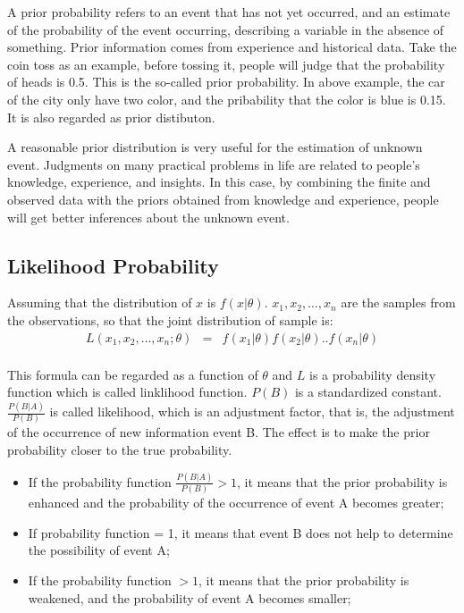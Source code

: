 A prior probability refers to an event that has not yet occurred, and an estimate of the probability of the event occurring, describing a variable in the absence of something. Prior information comes from experience and historical data. Take the coin toss as an example, before tossing it, people will judge that the probability of heads is 0.5. This is the so-called prior probability. In above example, the car of the city only have two color, and the pribability that the color is blue is 0.15. It is also regarded as prior distibuton.


A reasonable prior distribution is very useful for the estimation of unknown event. Judgments on many practical problems in life are related to people's knowledge, experience, and insights. In this case, by combining the finite and observed data with the priors obtained from knowledge and experience, people will get better inferences about the unknown event.



\subsection{Likelihood Probability}
Assuming that the distribution of $x$ is $f(x|\theta)$. $x_1,x_2,\dots,x_n$  are the samples from the observations, so that the joint distribution of sample is:
\begin{eqnarray*}
L(x_1,x_2,\dots,x_n;\theta) &=& f(x_1|\theta)f(x_2|\theta)..f(x_n|\theta) \\
\end{eqnarray*}

This formula  can be regarded as a function of $\theta$ and $L$ is a probability density function which is called linklihood function. $P(B)$ is a standardized constant.
$\frac{P(B|A)}{P(B)}$ is called likelihood, which is an adjustment factor, that is, the adjustment of the occurrence of new information event B. The effect is to make the prior probability closer to the true probability.
\begin{itemize}
  \item If the probability function $\frac{P(B|A)}{P(B)}>1$, it means that the prior probability is enhanced and the probability of the occurrence of event A becomes greater;
  \item If probability function = 1, it means that event B does not help to determine the possibility of event A;
  \item If the probability function $> 1$, it means that the prior probability is weakened, and the probability of event A becomes smaller;
\end{itemize}

